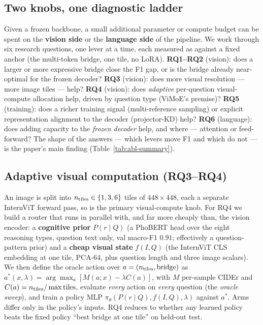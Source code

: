 \subsection{Two knobs, one diagnostic ladder}
\label{sec:method-ladder}

Given a frozen backbone, a small additional parameter or compute budget can be
spent on the \textbf{vision side} or the \textbf{language side} of the pipeline.
We work through six research questions, one lever at a time, each measured as
\dF{} against a fixed anchor (the multi-token bridge, one tile, no LoRA).
\textbf{RQ1--RQ2} (vision): does a larger or more expressive bridge close the F1
gap, or is the bridge already near-optimal for the frozen decoder?
\textbf{RQ3} (vision): does more visual resolution --- more image tiles --- help?
\textbf{RQ4} (vision): does \emph{adaptive} per-question visual-compute
allocation help, driven by question type (ViMoE's premise)?
\textbf{RQ5} (training): does a richer training signal (multi-reference sampling)
or explicit representation alignment to the decoder (projector-KD) help?
\textbf{RQ6} (language): does adding capacity to the \emph{frozen decoder} help,
and where --- attention or feed-forward? The shape of the answers --- which
levers move F1 and which do not --- is the paper's main finding
(Table~\ref{tab:abl-summary}).

\subsection{Adaptive visual computation (RQ3--RQ4)}
\label{sec:method-adaptive}

An image is split into $n_{\text{tiles}} \in \{1, 3, 6\}$ tiles of $448{\times}448$, each a
separate InternViT forward pass, so \ntiles{} is the primary visual-compute knob.
For RQ4 we build a router that runs in parallel with, and far more cheaply than,
the vision encoder: a \textbf{cognitive prior} $P(r \mid Q)$ (a PhoBERT head over
the eight reasoning types, question text only, val macro-F1 $0.91$; effectively a
question-pattern prior) and a \textbf{cheap visual state} $f(I, Q)$ (the
InternViT CLS embedding at one tile, PCA-64, plus question length and three image
scalars). We then define the oracle action over $a = (n_{\text{tiles}}, \text{bridge})$ as
$a^\ast(x,\lambda) = \arg\max_a [M(a;x) - \lambda C(a)]$, with $M$ per-sample
CIDEr and $C(a) = n_{\text{tiles}} / \max\text{tiles}$, evaluate \emph{every} action on
\emph{every} question (the \emph{oracle sweep}), and train a policy MLP
$\pi_\theta(P(r{\mid}Q), f(I,Q), \lambda)$ against $a^\ast$. Arms differ only in
the policy's inputs. RQ4 reduces to whether any learned policy beats the fixed
policy ``best bridge at one tile'' on held-out test.

